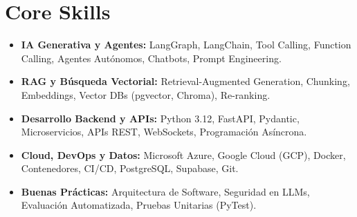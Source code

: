 \documentclass[a4paper,10pt]{article}
\begin{document}
\section{Core Skills}
\begin{itemize}
  \item \textbf{IA Generativa y Agentes:} LangGraph, LangChain, Tool Calling, Function Calling, Agentes Autónomos, Chatbots, Prompt Engineering.
  \item \textbf{RAG y Búsqueda Vectorial:} Retrieval-Augmented Generation, Chunking, Embeddings, Vector DBs (pgvector, Chroma), Re-ranking.
  \item \textbf{Desarrollo Backend y APIs:} Python 3.12, FastAPI, Pydantic, Microservicios, APIs REST, WebSockets, Programación Asíncrona.
  \item \textbf{Cloud, DevOps y Datos:} Microsoft Azure, Google Cloud (GCP), Docker, Contenedores, CI/CD, PostgreSQL, Supabase, Git.
  \item \textbf{Buenas Prácticas:} Arquitectura de Software, Seguridad en LLMs, Evaluación Automatizada, Pruebas Unitarias (PyTest).
\end{itemize}
\end{document}
